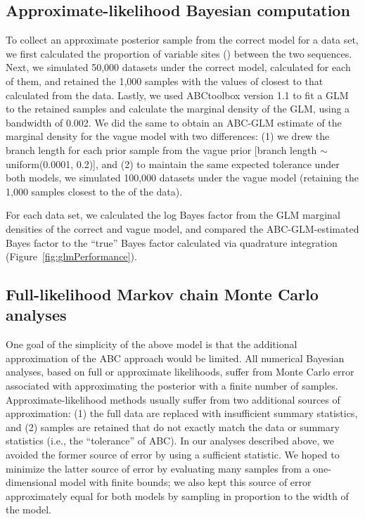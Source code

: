\subsection{Approximate-likelihood Bayesian computation}
To collect an approximate posterior sample from the correct model for a data
set, we first calculated the proportion of variable sites (\pvar) between the
two sequences.
Next, we simulated 50,000 datasets under the correct model, calculated \pvar
for each of them, and retained the 1,000 samples with the values of \pvar
closest to that calculated from the data.
Lastly, we used ABCtoolbox version 1.1 \cite{ABCtoolbox} to fit a GLM to the
retained samples and calculate the marginal density of the GLM, using a
bandwidth of 0.002.
We did the same to obtain an ABC-GLM estimate of the marginal density
for the vague model with two differences:
(1) we drew the branch length for each prior sample from the vague prior
[branch length $\sim$ uniform(0.0001, 0.2)], and
(2) to maintain the same expected tolerance under both models, we simulated
100,000 datasets under the vague model (retaining the 1,000 samples closest to
the \pvar of the data).

For each data set, we calculated the log Bayes factor from the GLM marginal
densities of the correct and vague model, and compared the ABC-GLM-estimated
Bayes factor to the ``true'' Bayes factor calculated via quadrature
integration (Figure~\ref{fig:glmPerformance}).

\subsection{Full-likelihood Markov chain Monte Carlo analyses}
One goal of the simplicity of the above model is that the additional
approximation of the ABC approach would be limited.
All numerical Bayesian analyses, based on full or approximate likelihoods,
suffer from Monte Carlo error associated with approximating the posterior with
a finite number of samples.
Approximate-likelihood methods usually suffer from two additional sources of
approximation:
(1) the full data are replaced with insufficient summary statistics, and
(2) samples are retained that do not exactly match the data or summary
statistics (i.e., the ``tolerance'' of ABC).
In our analyses described above, we avoided the former source of error by
using a sufficient statistic.
We hoped to minimize the latter source of error by evaluating many samples from
a one-dimensional model with finite bounds; we also kept this source of error
approximately equal for both models by sampling in proportion to the width of
the model.

